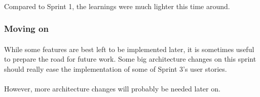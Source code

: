 \paragraph{} Compared to Sprint 1, the learnings were much lighter this time around.

\subsubsection{Moving on}

\paragraph{} While some features are best left to be implemented later, it is sometimes useful to prepare the road for future work. Some big architecture changes on this sprint should really ease the implementation of some of Sprint 3's user stories.

\paragraph{} However, more architecture changes will probably be needed later on.
